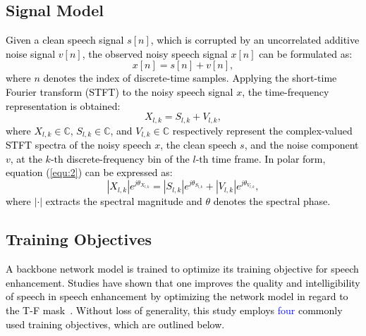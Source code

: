 \documentclass[journal]{IEEEtran}
\newcommand{\qian}[1]{{\color{magenta}#1}}
\begin{document}
\subsection{Signal Model}\label{sec:2.1}
\textcolor{black}{Given a clean speech signal $s[n]$, which is corrupted by an uncorrelated additive noise signal $v[n]$, the observed noisy speech signal $x[n]$ can be formulated as:
\begin{equation} \label{equ:1}
x[n] = s[n] + v[n],
\end{equation}
where $n$ denotes the index of discrete-time samples. Applying the short-time Fourier transform (STFT) to the noisy speech signal $x$, the time-frequency representation is obtained:
\begin{equation} \label{equ:2}
X_{l,k} = S_{l,k} + V_{l,k},
\end{equation}
where $X_{l,k}\!\in\!\mathbb{C}$, $S_{l,k}\!\in\!\mathbb{C}$, and $V_{l,k}\!\in\!\mathbb{C}$ respectively represent the complex-valued STFT spectra of the noisy speech $x$, the clean speech $s$, and the noise component $v$,  at the $k\text{-th}$ discrete-frequency bin of the $l\text{-th}$ time frame. In polar form, equation (\ref{equ:2}) can be expressed as:
\begin{equation} \label{equ:3}
|X_{l,k}|e^{j\theta_{X_{l,k}}} = |S_{l,k}|e^{j\theta_{S_{l,k}}} + |V_{l,k}|e^{j\theta_{V_{l,k}}},
\end{equation}
where $|\cdot|$ extracts the spectral magnitude and $\theta$ denotes the spectral phase.}



\subsection{Training Objectives}\label{sec:2.2}
\textcolor{black}{A backbone network model is trained to optimize its training objective for speech enhancement. Studies have shown that one improves the quality and intelligibility of speech in speech enhancement by optimizing the network model in regard to the T-F mask~\cite{tfaj}. \textcolor{black}{Without loss of generality, this study employs \textcolor{blue}{four} commonly used training objectives, which are outlined below.}}

\end{document}
